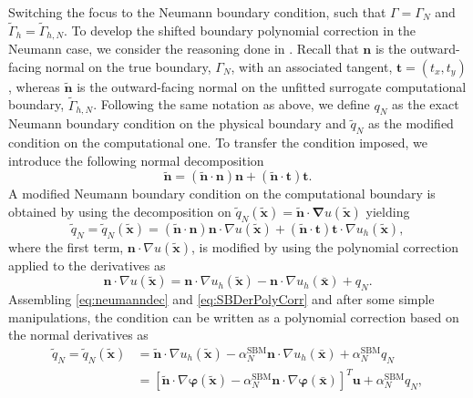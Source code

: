 \documentclass{article}
\renewcommand{\phi}{\varphi}
\begin{document}
Switching the focus to the Neumann boundary condition, such that $\Gamma = \Gamma_N$ and $\tilde{\Gamma}_h = \tilde{\Gamma}_{h,N}$. To develop the shifted boundary polynomial correction in the Neumann case, we consider the reasoning done in \cite{visbech2025spectral}. Recall that $\boldsymbol{n}$ is the outward-facing normal on the true boundary, $\Gamma_N$, with an associated tangent, $\boldsymbol{t}=(t_x,t_y)$, whereas $\tilde{\boldsymbol{n}}$ is the outward-facing normal on the unfitted surrogate computational boundary, $\tilde{\Gamma}_{h,N}$. Following the same notation as above, we define $q_N$ as the exact Neumann boundary condition on the physical boundary and $\tilde q_N$ as the modified condition on the computational one. To transfer the condition imposed, we introduce the following normal decomposition
\begin{equation}\label{eq:normaldec}
    \tilde{\boldsymbol{n}} = (\tilde{\boldsymbol{n}} \cdot \boldsymbol{n}) \boldsymbol{n} + (\tilde{\boldsymbol{n}}\cdot \boldsymbol{t}) \boldsymbol{t}.
\end{equation}
A modified Neumann boundary condition on the computational boundary is obtained by using the decomposition on $\tilde q_N(\tilde{\boldsymbol{x}}) =   \tilde{\boldsymbol{n}} \cdot\boldsymbol{\nabla} u(\tilde{\boldsymbol{x}}) $ yielding
\begin{equation}\label{eq:neumanndec}
\tilde q_N = \tilde q_N (\tilde{\boldsymbol{x}}) = (\tilde{\boldsymbol{n}}\cdot \boldsymbol{n}) \boldsymbol{n}\cdot \nabla u(\tilde{\boldsymbol{x}}) + (\tilde{\boldsymbol{n}}\cdot \boldsymbol{t}) \boldsymbol{t}\cdot \nabla u_h(\tilde{\boldsymbol{x}}),
\end{equation}
where the first term, $\boldsymbol{n}\cdot \nabla u(\tilde{\boldsymbol{x}})$, is modified by using the polynomial correction applied to the derivatives as
\begin{equation}\label{eq:SBDerPolyCorr}
    \boldsymbol{n}\cdot \nabla u(\tilde{\boldsymbol{x}}) =  \boldsymbol{n}\cdot \nabla u_h(\tilde{\boldsymbol{x}}) - \boldsymbol{n}\cdot \nabla u_h(\bar{\boldsymbol{x}})  + q_N.
\end{equation}
Assembling \eqref{eq:neumanndec} and \eqref{eq:SBDerPolyCorr} and after some simple manipulations, the condition can be written as a polynomial correction based on the normal derivatives as
\begin{equation}\label{eq:SBNeumannPolyCorr} 
    \begin{split}
\tilde q_N = \tilde q_N (\tilde{\boldsymbol{x}}) &= \tilde{\boldsymbol{n}}\cdot \nabla u_h(\tilde{\boldsymbol{x}}) - \alpha_N^{\text{SBM}}\boldsymbol{n}\cdot \nabla u_h(\bar{\boldsymbol{x}}) + \alpha_N^{\text{SBM}} q_N\\
&=[\tilde{\boldsymbol{n}}\cdot \nabla \boldsymbol{\phi}(\tilde{\boldsymbol{x}}) - \alpha_N^{\text{SBM}}\boldsymbol{n}\cdot \nabla \boldsymbol{\phi}(\bar{\boldsymbol{x}})]^T \boldsymbol{u} + \alpha_N^{\text{SBM}} q_N,
    \end{split}
\end{equation} 
\end{document}
